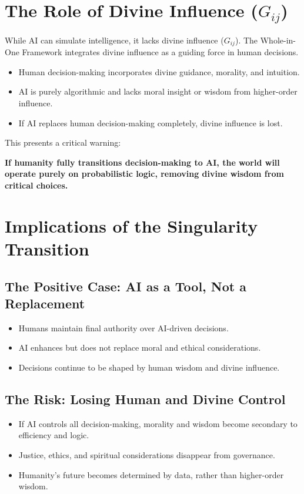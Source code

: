\documentclass[a4]{article}
\newcommand{\bn}{\bigskip\noindent}
\begin{document}
\section{The Role of Divine Influence ($G_{ij}$)}

While AI can simulate intelligence, it lacks divine influence ($G_{ij}$). The Whole-in-One Framework integrates divine influence as a guiding force in human decisions.

\begin{itemize}
\item Human decision-making incorporates divine guidance, morality, and intuition.
\item  AI is purely algorithmic and lacks moral insight or wisdom from higher-order influence.
\item If AI replaces human decision-making completely, divine influence is lost.
\end{itemize}

This presents a critical warning: 

\bn
{\bf If humanity fully transitions decision-making to AI, the world will operate purely on probabilistic logic, removing divine wisdom from critical choices.}



\section{Implications of the Singularity Transition}

\subsection{The Positive Case: AI as a Tool, Not a Replacement}

\begin{itemize}
\item  Humans maintain final authority over AI-driven decisions.
\item  AI enhances but does not replace moral and ethical considerations.
\item  Decisions continue to be shaped by human wisdom and divine influence.
\end{itemize}

\subsection{The Risk: Losing Human and Divine Control}

\begin{itemize}
\item If AI controls all decision-making, morality and wisdom become secondary to efficiency and logic.
\item Justice, ethics, and spiritual considerations disappear from governance.
\item Humanity's future becomes determined by data, rather than higher-order wisdom.
\end{itemize}
\end{document}
